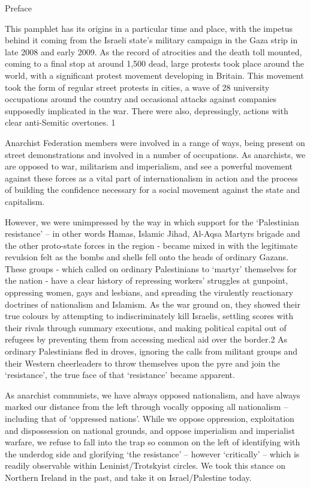 Preface

This pamphlet has its origins in a particular time and place, with the impetus behind it coming from the Israeli state’s military campaign in the Gaza strip in late 2008 and early 2009. As the record of atrocities and the death toll mounted, coming to a final stop at around 1,500 dead, large protests took place around the world, with a significant protest movement developing in Britain. This movement took the form of regular street protests in cities, a wave of 28 university occupations around the country and occasional attacks against companies supposedly implicated in the war. There were also, depressingly, actions with clear anti-Semitic overtones. 1

Anarchist Federation members were involved in a range of ways, being present on street demonstrations and involved in a number of occupations. As anarchists, we are opposed to war, militarism and imperialism, and see a powerful movement against these forces as a vital part of internationalism in action and the process of building the confidence necessary for a social movement against the state and capitalism.

However, we were unimpressed by the way in which support for the ‘Palestinian resistance’ – in other words Hamas, Islamic Jihad, Al-Aqsa Martyrs brigade and the other proto-state forces in the region - became mixed in with the legitimate revulsion felt as the bombs and shells fell onto the heads of ordinary Gazans. These groups - which called on ordinary Palestinians to ‘martyr’ themselves for the nation - have a clear history of repressing workers’ struggles at gunpoint, oppressing women, gays and lesbians, and spreading the virulently reactionary doctrines of nationalism and Islamism. As the war ground on, they showed their true colours by attempting to indiscriminately kill Israelis, settling scores with their rivals through summary executions, and making political capital out of refugees by preventing them from accessing medical aid over the border.2 As ordinary Palestinians fled in droves, ignoring the calls from militant groups and their Western cheerleaders to throw themselves upon the pyre and join the ‘resistance’, the true face of that ‘resistance’ became apparent.

As anarchist communists, we have always opposed nationalism, and have always marked our distance from the left through vocally opposing all nationalism – including that of ‘oppressed nations’. While we oppose oppression, exploitation and dispossession on national grounds, and oppose imperialism and imperialist warfare, we refuse to fall into the trap so common on the left of identifying with the underdog side and glorifying ‘the resistance’ – however ‘critically’ – which is readily observable within Leninist/Trotskyist circles. We took this stance on Northern Ireland in the past, and take it on Israel/Palestine today.

